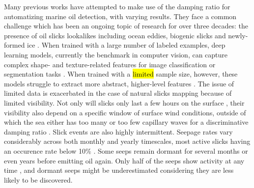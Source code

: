 \documentclass[journal]{IEEEtran}
\begin{document}
Many previous works have attempted to make use of the damping ratio for automatizing marine oil detection, with varying results. They face a common challenge which has been an ongoing topic of research for over 
three decades: the presence of oil slicks lookalikes including ocean eddies, biogenic slicks and newly-formed ice \cite{johanssonCanMineralOil2020,hovlandSlickDetectionSAR1994,alpersOilsSurfactants2004,
alpersOilSpillDetection2017,espedalSatelliteDetectionNatural1996}. 
When trained with a large number of labeled examples, deep learning models, currently the benchmark in computer vision, can capture complex shape- and texture-related features for image classification or 
segmentation tasks \cite{goodfellowDeepLearning2016}. When trained with a \hl{limited} sample size, however, these models struggle to extract more abstract, higher-level features
\cite{bengioDeepLearnersBenefit2011,bengioDeepLearningRepresentations2012}. The issue of limited data is exacerbated in the case of natural slicks mapping because of limited visibility. 
Not only will slicks only last a few hours on the surface \cite{jatiaultMonitoringNaturalOil2017,daneshgaraslHindcastModelingOil2017,oreillyDistributionMagnitudeVariability2022}, 
their visibility also depend on a specific window of surface wind conditions, outside of which the sea either has too many or too few capillary waves for a discriminative 
damping ratio \cite{quigleyInvestigationDampingRatio2023,sausDetectionDelineationProduced2021,gadeImagingBiogenicAnthropogenic1998}. 
\IEEEpubidadjcol  
Slick events are also highly intermittent. Seepage rates vary considerably across both monthly and yearly timescales, most active slicks having an occurence rate below 10\% 
\cite{jatiaultNaturalOilSeep2024,oreillyDistributionMagnitudeVariability2022}. Some seeps remain dormant for several months or even years before emitting oil again. Only half of the seeps show activity at any time 
\cite{jatiaultMonitoringNaturalOil2017,garcia-pinedaRemotesensingEvaluationGeophysical2010}, and dormant seeps might be underestimated considering they are less likely to be discovered.
\end{document}
